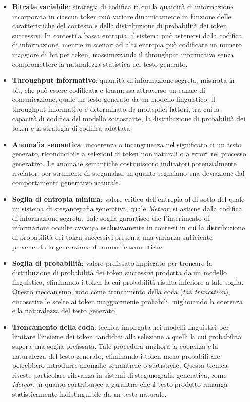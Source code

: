 \begin{itemize}
	\item \textbf{Bitrate variabile}: strategia di codifica in cui la quantità di informazione incorporata in ciascun token può variare dinamicamente in funzione delle caratteristiche del contesto e della distribuzione di probabilità dei token successivi. In contesti a bassa entropia, il sistema può astenersi dalla codifica di informazione, mentre in scenari ad alta entropia può codificare un numero maggiore di bit per token, massimizzando il throughput informativo senza compromettere la naturalezza statistica del testo generato.
	\item \textbf{Throughput informativo}: quantità di informazione segreta, misurata in bit, che può essere codificata e trasmessa attraverso un canale di comunicazione, quale un testo generato da un modello linguistico. Il throughput informativo è determinato da molteplici fattori, tra cui la capacità di codifica del modello sottostante, la distribuzione di probabilità dei token e la strategia di codifica adottata.
	\item \textbf{Anomalia semantica}: incoerenza o incongruenza nel significato di un testo generato, riconducibile a selezioni di token non naturali o a errori nel processo generativo. Le anomalie semantiche costituiscono indicatori potenzialmente rivelatori per strumenti di steganalisi, in quanto segnalano una deviazione dal comportamento generativo naturale.
	\item \textbf{Soglia di entropia minima}: valore critico dell'entropia al di sotto del quale un sistema di steganografia generativa, quale \emph{Meteor}, si astiene dalla codifica di informazione segreta. Tale soglia garantisce che l'inserimento di informazioni occulte avvenga esclusivamente in contesti in cui la distribuzione di probabilità dei token successivi presenta una varianza sufficiente, prevenendo la generazione di anomalie semantiche.
	\item \textbf{Soglia di probabilità}: valore prefissato impiegato per troncare la distribuzione di probabilità dei token successivi prodotta da un modello linguistico, eliminando i token la cui probabilità risulta inferiore a tale soglia. Questo meccanismo, noto come troncamento della coda (\emph{tail truncation}), circoscrive le scelte ai token maggiormente probabili, migliorando la coerenza e la naturalezza del testo generato.
	\item \textbf{Troncamento della coda}: tecnica impiegata nei modelli linguistici per limitare l'insieme dei token candidati alla selezione a quelli la cui probabilità supera una soglia prefissata. Tale procedura migliora la coerenza e la naturalezza del testo generato, eliminando i token meno probabili che potrebbero introdurre anomalie semantiche o statistiche. Questa tecnica riveste particolare rilevanza in sistemi di steganografia generativa, come \emph{Meteor}, in quanto contribuisce a garantire che il testo prodotto rimanga statisticamente indistinguibile da un testo naturale.

\end{itemize}
